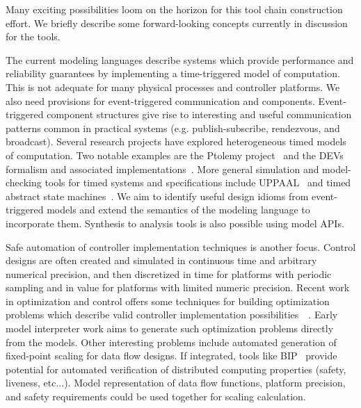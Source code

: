 
Many exciting possibilities loom on the horizon for this tool chain construction effort.  We briefly describe some forward-looking concepts currently in discussion for the tools.  %


The current modeling languages describe systems which provide performance and reliability guarantees by implementing a time-triggered model of computation.  This is not adequate for many physical processes and controller platforms.  We also need provisions for event-triggered communication and components.  Event-triggered component structures give rise to interesting and useful communication patterns common in practical systems (e.g. publish-subscribe, rendezvous, and broadcast). Several research projects have explored heterogeneous timed models of computation.  Two notable examples are the Ptolemy project~\cite{ucb:ptolemy2} and the DEVs formalism and associated implementations~\cite{DEVSpp}.  More general simulation and model-checking tools for timed systems and specifications include UPPAAL~\cite{UPPAAL} and timed abstract state machines~\cite{TASM}.  We aim to identify useful design idioms from event-triggered models and extend the semantics of the modeling language to incorporate them.  Synthesis to analysis tools is also possible using model APIs.  

Safe automation of controller implementation techniques is another focus.  Control designs are often created and simulated in continuous time and arbitrary numerical precision, and then discretized in time for platforms with periodic sampling and in value for platforms with limited numeric precision.  Recent work in optimization and control offers some techniques for building optimization problems which describe valid controller implementation possibilities~\cite{LMITrunc}~\cite{LMINetwork}. Early model interpreter work aims to generate such optimization problems directly from the models.  Other interesting problems include automated generation of fixed-point scaling for data flow designs.  If integrated, tools like BIP~\cite{BasuBozgaSifakis07} provide potential for automated verification of distributed computing properties (safety, liveness, etc...).  Model representation of data flow functions, platform precision, and safety requirements could be used together for scaling calculation.
  
